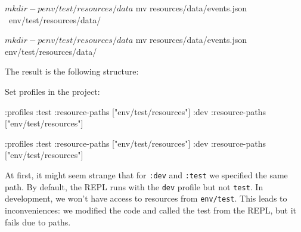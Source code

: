 \ifnarrow

\begin{english}
  \begin{bash}
$ mkdir -p env/test/resources/data
$ mv resources/data/events.json \
     env/test/resources/data/
  \end{bash}
\end{english}

\else

\begin{english}
  \begin{bash}
$ mkdir -p env/test/resources/data
$ mv resources/data/events.json env/test/resources/data/
  \end{bash}
\end{english}

\fi

\noindent
The result is the following structure:

\begin{english}
\end{english}


\linegap

\noindent
Set profiles in the project:

\ifnarrow

\begin{english}
  \begin{clojure}
:profiles {:test {:resource-paths
                  ["env/test/resources"]}
           :dev {:resource-paths
                 ["env/test/resources"]}}
  \end{clojure}
\end{english}

\else

\begin{english}
  \begin{clojure}
:profiles {:test {:resource-paths ["env/test/resources"]}
           :dev  {:resource-paths ["env/test/resources"]}}
  \end{clojure}
\end{english}

\fi

At first, it might seem strange that for \verb|:dev| and \verb|:test| we specified the same path. By default, the REPL runs with the \verb|dev| profile but not \verb|test|. In development, we won't have access to resources from \verb|env/test|. This leads to inconveniences: we modified the code and called the test from the REPL, but it fails due to paths.

